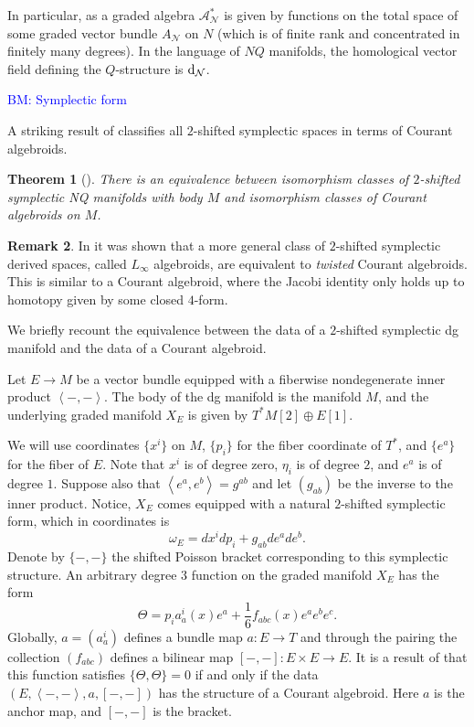 \documentclass{article}
\newcommand{\cN}{\mathcal{N}}
\def\sA{\mathcal{A}}
\def\d{{\rm d}}
\def\xto{\xrightarrow}
\newtheorem{theorem}{Theorem}[section]
\theoremstyle{definition}
\newtheorem{remark}[theorem]{Remark}
\theoremstyle{remark}
\def\brian{\textcolor{blue}{BM: }\textcolor{blue}}
\begin{document}
In particular, as a graded algebra $\sA^*_\cN$ is given by functions on the total space of some graded vector bundle $A_\cN$ on $N$ (which is of finite rank and concentrated in finitely many degrees). 
In the language of $NQ$ manifolds, the homological vector field defining the $Q$-structure is $\d_\cN$. 

\brian{Symplectic form}

A striking result of \cite{Roytenberg:2002nu} classifies all $2$-shifted symplectic spaces in terms of Courant algebroids. 

\begin{theorem}[\cite{Roytenberg:2002nu}]
There is an equivalence between isomorphism classes of $2$-shifted symplectic NQ manifolds with body $M$ and isomorphism classes of Courant algebroids on $M$.
\end{theorem}

\begin{remark}
In \cite{PymSafronov} it was shown that a more general class of $2$-shifted symplectic derived spaces, called $L_\infty$ algebroids, are equivalent to {\em twisted} Courant algebroids. 
This is similar to a Courant algebroid, where the Jacobi identity only holds up to homotopy given by some closed $4$-form. 
\end{remark}

We briefly recount the equivalence between the data of a $2$-shifted symplectic dg manifold and the data of a Courant algebroid.

\def\Sym{{\rm Sym}}

Let $E \to M$ be a vector bundle equipped with a fiberwise nondegenerate inner product $\left<-,-\right>$.
The body of the dg manifold is the manifold $M$, and the underlying graded manifold $X_E$ is given by $T^*M [2] \oplus E[1]$. 

We will use coordinates $\{x^i\}$ on $M$, $\{p_i\}$ for the fiber coordinate of $T^*$, and $\{e^a\}$ for the fiber of $E$. 
Note that $x^i$ is of degree zero, $\eta_i$ is of degree $2$, and $e^a$ is of degree $1$.
Suppose also that $\left<e^a, e^b\right> = g^{ab}$ and let $(g_{ab})$ be the inverse to the inner product. 
Notice, $X_E$ comes equipped with a natural $2$-shifted symplectic form, which in coordinates is 
\[
\omega_E = d x^i d p_i + g_{ab} d e^a d e^b .
\]
Denote by $\{-,-\}$ the shifted Poisson bracket corresponding to this symplectic structure. 
An arbitrary degree $3$ function on the graded manifold $X_E$ has the form
\[
\Theta = p_i a_a^i (x) e^a + \frac{1}{6} f_{abc} (x) e^a e^b e^c .
\]
Globally, $a = (a_a^i)$ defines a bundle map $a : E \to T$ and through the pairing the collection $(f_{abc})$ defines a bilinear map $[-,-] : E \times E \to E$. 
It is a result of \cite{Roytenberg:2002nu} that this function satisfies $\{\Theta, \Theta\} = 0$ if and only if the data $(E, \left<-,-\right>, a, [-,-])$ has the structure of a Courant algebroid. 
Here $a$ is the anchor map, and $[-,-]$ is the bracket. 
\end{document}
